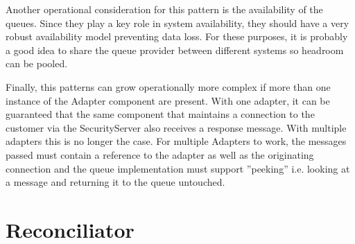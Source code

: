 \documentclass[10pt,a4paper]{article}
\begin{document}
Another operational consideration for this pattern is the availability of the queues. Since they play a key role in system availability, they should have a very robust availability model preventing data loss. For these purposes, it is probably a good idea to share the queue provider between different systems so headroom can be pooled.

Finally, this patterns can grow operationally more complex if more than one instance of the Adapter component are present. With one adapter, it can be guaranteed that the same component that maintains a connection to the customer via the SecurityServer also receives a response message. With multiple adapters this is no longer the case. For multiple Adapters to work, the messages passed must contain a reference to the adapter as well as the originating connection and the queue implementation must support ''peeking'' i.e. looking at a message and returning it to the queue untouched.
 
\section{Reconciliator}
\label{sec:p:9}
\end{document}
